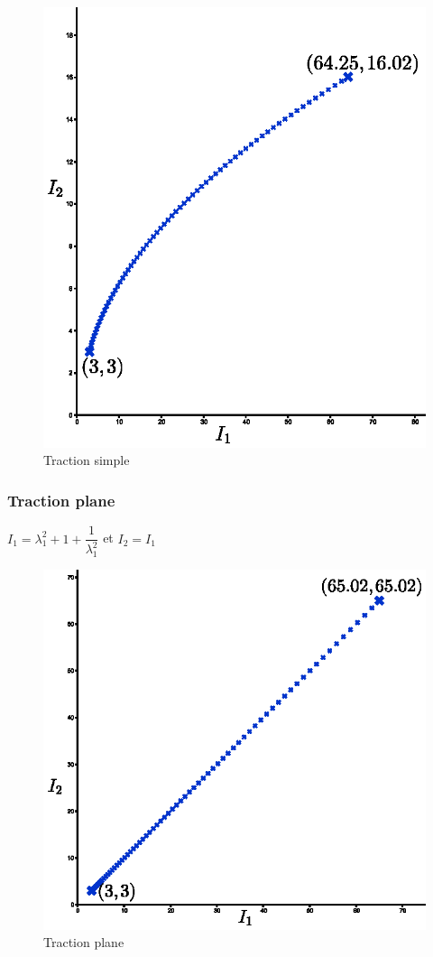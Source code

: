 \documentclass[a4paper,11pt]{article}
\begin{document}
\begin{figure}[!ht]
\centering\includegraphics[scale=0.7]{scilab/q2-6-1.eps} 
\caption{Traction simple}
\label{fig:tract_simple}
\end{figure}

\subsubsection{Traction plane}
$I_1=\lambda_1^2+1+\dfrac{1}{\lambda_1^2}$ et $I_2=I_1$ 
	
\begin{figure}[!ht]
\centering\includegraphics[scale=0.8]{scilab/q2-6-2.eps} 
\caption{Traction plane}
\label{fig:tract_plane}
\end{figure}
\end{document}
